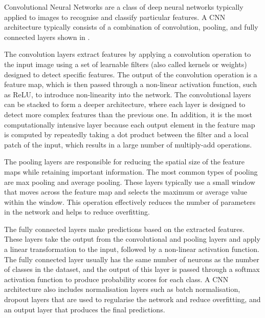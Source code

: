 Convolutional Neural Networks are a class of deep neural networks typically applied to images to recognise and classify particular features. A CNN architecture typically consists of a combination of convolution, pooling, and fully connected layers shown in .

The convolution layers extract features by applying a convolution operation to the input image using a set of learnable filters (also called kernels or weights) designed to detect specific features. The output of the convolution operation is a feature map, which is then passed through a non-linear activation function, such as ReLU, to introduce non-linearity into the network. The convolutional layers can be stacked to form a deeper architecture, where each layer is designed to detect more complex features than the previous one. In addition, it is the most computationally intensive layer because each output element in the feature map is computed by repeatedly taking a dot product between the filter and a local patch of the input, which results in a large number of multiply-add operations.

The pooling layers are responsible for reducing the spatial size of the feature maps while retaining important information. The most common types of pooling are max pooling and average pooling. These layers typically use a small window that moves across the feature map and selects the maximum or average value within the window. This operation effectively reduces the number of parameters in the network and helps to reduce overfitting.

The fully connected layers make predictions based on the extracted features. These layers take the output from the convolutional and pooling layers and apply a linear transformation to the input, followed by a non-linear activation function. The fully connected layer usually has the same number of neurons as the number of classes in the dataset, and the output of this layer is passed through a softmax activation function to produce probability scores for each class.
A CNN architecture also includes normalisation layers such as batch normalisation, dropout layers that are used to regularise the network and reduce overfitting, and an output layer that produces the final predictions.

 

